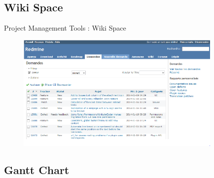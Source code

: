 \documentclass[utf8,compress]{beamer}
\begin{document}
\subsection{Wiki Space}

\begin{frame}{Project Management Tools : Wiki Space}
 \begin{figure}[h]
        \includegraphics[width=10cm]{wiki.png}
    \end{figure}
\end{frame}


\subsection{Gantt Chart}
\end{document}
